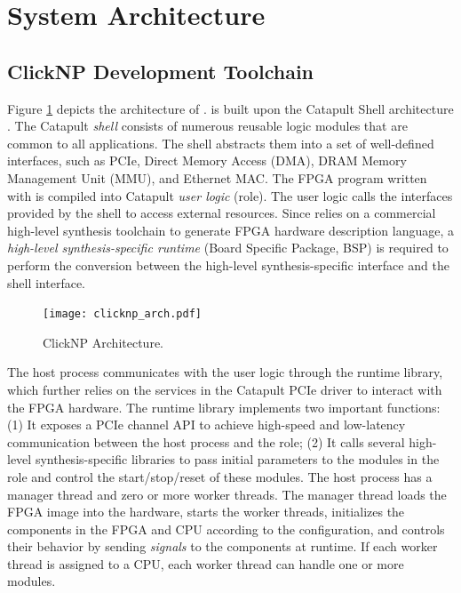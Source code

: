 \section{System Architecture}
\label{clicknp:sec:architecture}

\subsection{ClickNP Development Toolchain}
\label{clicknp:subsec:sysarch}

Figure \ref{clicknp:fig:clicknp} depicts the architecture of \name.
\name is built upon the Catapult Shell architecture \cite {putnam2014reconfigurable}.
The Catapult \textit {shell} consists of numerous reusable logic modules that are common to all applications.
The shell abstracts them into a set of well-defined interfaces, such as PCIe, Direct Memory Access (DMA), DRAM Memory Management Unit (MMU), and Ethernet MAC.
The FPGA program written with \name is compiled into Catapult \textit {user logic} (role).
The user logic calls the interfaces provided by the shell to access external resources.
Since \name relies on a commercial high-level synthesis toolchain to generate FPGA hardware description language, a \textit {high-level synthesis-specific runtime} (Board Specific Package, BSP) is required to perform the conversion between the high-level synthesis-specific interface and the shell interface.


\begin{figure}
	\centering
	\texttt{[image: clicknp\_arch.pdf]}
	\caption{ClickNP Architecture.}
	\label{clicknp:fig:clicknp}
\end{figure}


The \name{} host process communicates with the \name{} user logic through the \name{} runtime library, which further relies on the services in the Catapult PCIe driver to interact with the FPGA hardware.
The \name{} runtime library implements two important functions:
(1) It exposes a PCIe channel API to achieve high-speed and low-latency communication between the \name{} host process and the role;
(2) It calls several high-level synthesis-specific libraries to pass initial parameters to the modules in the role and control the start/stop/reset of these modules.
The \name{} host process has a manager thread and zero or more worker threads.
The manager thread loads the FPGA image into the hardware, starts the worker threads, initializes the \name components in the FPGA and CPU according to the configuration, and controls their behavior by sending \textit {signals} to the components at runtime.
If each worker thread is assigned to a CPU, each worker thread can handle one or more modules.

